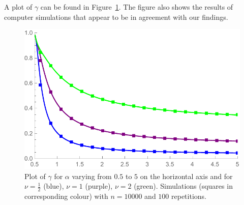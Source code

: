 \begin{theorem}
\end{theorem}

\noindent
A plot of $\gamma$ can be found in Figure~\ref{fig:gamma}. The figure also shows the results of computer simulations that appear to be in agreement with our findings.


\begin{figure}[!ht]
    \centering
    \includegraphics[scale=0.6]{figures/cn10000nu0512rep100a05to5Squares.pdf}
    \caption{Plot of $\gamma$ for $\alpha$ varying from $0.5$ to $5$ on the horizontal axis and 
    for $\nu=\frac{1}{2}$ (blue), $\nu=1$ (purple), $\nu=2$ (green). Simulations (squares in corresponding colour) with $n=10000$ and $100$ repetitions.\label{fig:gamma}}
\end{figure}

